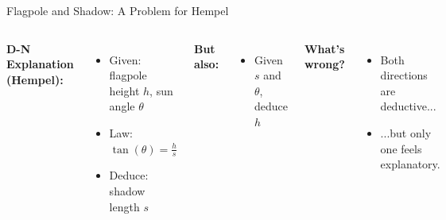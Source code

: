 \documentclass[fleqn]{beamer}
\begin{document}
\begin{frame}{Flagpole and Shadow: A Problem for Hempel}

\begin{columns}

\scriptsize
\vspace{-0.5em}
\textbf{D-N Explanation (Hempel):}
\begin{itemize}
  \item Given: flagpole height $h$, sun angle $\theta$
  \item Law: $\tan(\theta) = \frac{h}{s}$
  \item Deduce: shadow length $s$
\end{itemize}

\vspace{0.5em}
\textbf{But also:}
\begin{itemize}
  \item Given $s$ and $\theta$, deduce $h$
\end{itemize}

\vspace{0.5em}
\textbf{What's wrong?}
\begin{itemize}
  \item Both directions are deductive...
  \item ...but only one feels explanatory.
\end{itemize}



\end{columns}

\end{frame}
\end{document}

